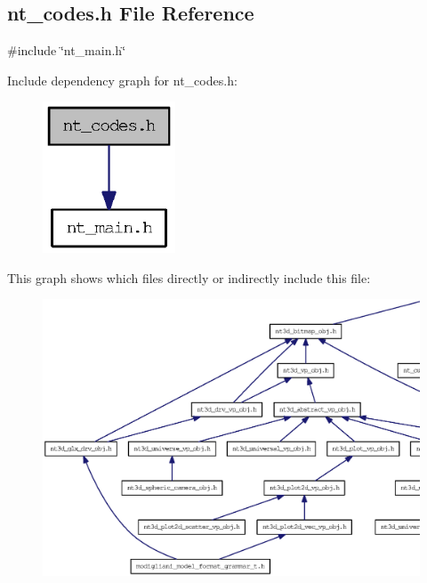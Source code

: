\subsection{nt\_\-codes.h File Reference}
\label{nt__codes_8h}
{\ttfamily \#include \char`\"{}nt\_\-main.h\char`\"{}}\par
Include dependency graph for nt\_\-codes.h:
\nopagebreak
\begin{figure}[H]
\begin{center}
\leavevmode
\includegraphics[width=112pt]{nt__codes_8h__incl}
\end{center}
\end{figure}
This graph shows which files directly or indirectly include this file:
\nopagebreak
\begin{figure}[H]
\begin{center}
\leavevmode
\includegraphics[width=400pt]{nt__codes_8h__dep__incl}
\end{center}
\end{figure}
